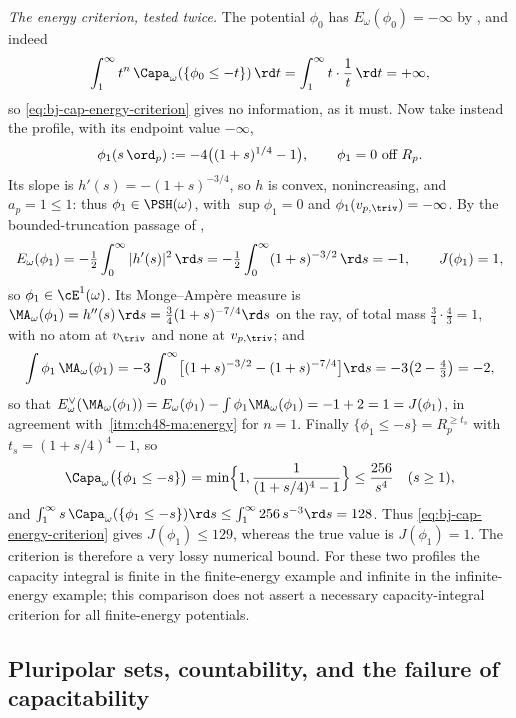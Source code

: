 \begin{example}
\emph{The energy criterion, tested twice.}  The potential $\phi_0$ has
$E_\omega(\phi_0)=-\infty$ by , and indeed
\[
 \int_1^\infty t^n\,\Capa_\omega(\{\phi_0\le-t\})\,\rd t
 =\int_1^\infty t\cdot\frac1t\,\rd t=+\infty ,
\]
so \eqref{eq:bj-cap-energy-criterion} gives no information, as it must.
Now take instead the profile, with its endpoint value $-\infty$,
\[
 \phi_1(s\,\ord_p):=-4\bigl((1+s)^{1/4}-1\bigr),\qquad
 \phi_1=0\ \text{off}\ R_p .
\]
Its slope is $h'(s)=-(1+s)^{-3/4}$, so $h$ is convex, nonincreasing,
and $a_p=1\le1$: thus $\phi_1\in\PSH(\omega)$, with
$\sup\phi_1=0$ and $\phi_1(v_{p,\triv})=-\infty$.  By
the bounded-truncation passage of ,
\[
 E_\omega(\phi_1)=-\tfrac12\int_0^\infty|h'(s)|^2\,\rd s
 =-\tfrac12\int_0^\infty(1+s)^{-3/2}\,\rd s=-1,
 \qquad J(\phi_1)=1,
\]
so $\phi_1\in\cE^1(\omega)$.  Its Monge--Amp\`ere measure is
$\MA_\omega(\phi_1)=h''(s)\,\rd s=\tfrac34(1+s)^{-7/4}\rd s$ on the ray,
of total mass $\tfrac34\cdot\tfrac43=1$, with no atom at
$v_{\triv}$ and none at $v_{p,\triv}$; and
\[
 \int\phi_1\,\MA_\omega(\phi_1)
 =-3\int_0^\infty\bigl[(1+s)^{-3/2}-(1+s)^{-7/4}\bigr]\rd s
 =-3\bigl(2-\tfrac43\bigr)=-2,
\]
so that $E^\vee_\omega(\MA_\omega(\phi_1))
=E_\omega(\phi_1)-\int\phi_1\MA_\omega(\phi_1)=-1+2=1=J(\phi_1)$, in
agreement with \,\cref{itm:ch48-ma:energy}
for $n=1$.  Finally
$\{\phi_1\le-s\}=R_p^{\ge t_s}$ with $t_s=(1+s/4)^4-1$, so
\[
 \Capa_\omega\bigl(\{\phi_1\le-s\}\bigr)
 =\min\Bigl\{1,\frac1{(1+s/4)^4-1}\Bigr\}\le\frac{256}{s^4}
 \quad(s\ge1),
\]
and
$\int_1^\infty s\,\Capa_\omega(\{\phi_1\le-s\})\rd s\le
\int_1^\infty256\,s^{-3}\rd s=128$.  Thus
\eqref{eq:bj-cap-energy-criterion} gives $J(\phi_1)\le129$, whereas the
true value is $J(\phi_1)=1$.  The criterion is therefore a very lossy
numerical bound. For these two profiles the capacity integral is finite
in the finite-energy example and infinite in the infinite-energy example;
this comparison does not assert a necessary capacity-integral criterion
for all finite-energy potentials.
\end{example}

\subsection{Pluripolar sets, countability, and the failure of capacitability}
\label{sec:ch48-ex-pluripolar}

